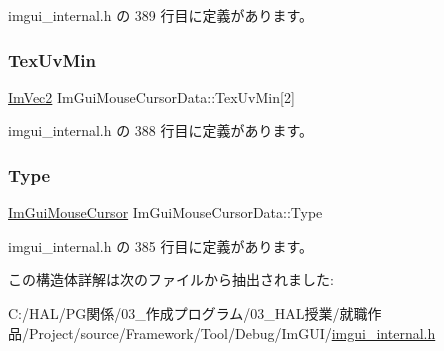  imgui\+\_\+internal.\+h の 389 行目に定義があります。

\mbox{\label{struct_im_gui_mouse_cursor_data_add35adb991fcfd03ae33c3607aa0c842}} 
\subsubsection{\texorpdfstring{Tex\+Uv\+Min}{TexUvMin}}
{\footnotesize\ttfamily \mbox{\hyperlink{struct_im_vec2}{Im\+Vec2}} Im\+Gui\+Mouse\+Cursor\+Data\+::\+Tex\+Uv\+Min\mbox{[}2\mbox{]}}



 imgui\+\_\+internal.\+h の 388 行目に定義があります。

\mbox{\label{struct_im_gui_mouse_cursor_data_ab58df812a8caf8741415053515b8f347}} 
\subsubsection{\texorpdfstring{Type}{Type}}
{\footnotesize\ttfamily \mbox{\hyperlink{imgui_8h_a9223d6c82bb5d12c2eab5f829ca520ef}{Im\+Gui\+Mouse\+Cursor}} Im\+Gui\+Mouse\+Cursor\+Data\+::\+Type}



 imgui\+\_\+internal.\+h の 385 行目に定義があります。



この構造体詳解は次のファイルから抽出されました\+:\begin{DoxyCompactItemize}
\item 
C\+:/\+H\+A\+L/\+P\+G関係/03\+\_\+作成プログラム/03\+\_\+\+H\+A\+L授業/就職作品/\+Project/source/\+Framework/\+Tool/\+Debug/\+Im\+G\+U\+I/\mbox{\hyperlink{imgui__internal_8h}{imgui\+\_\+internal.\+h}}\end{DoxyCompactItemize}
